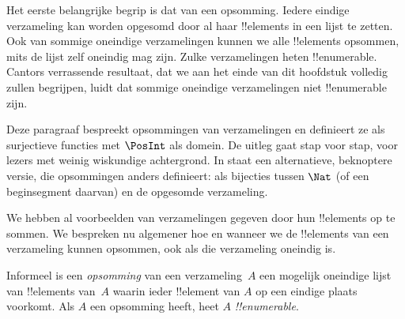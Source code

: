 \documentclass[openany]{memoir}
\begin{document}
Het eerste belangrijke begrip is dat van een opsomming. Iedere eindige
verzameling kan worden opgesomd door al haar !!{element}s in een lijst te
zetten. Ook van sommige oneindige verzamelingen kunnen we alle !!{element}s
opsommen, mits de lijst zelf oneindig mag zijn. Zulke verzamelingen heten
!!{enumerable}. Cantors verrassende resultaat, dat we aan het einde van dit
hoofdstuk volledig zullen begrijpen, luidt dat sommige oneindige verzamelingen
niet !!{enumerable} zijn.
\endgroup

\begingroup
\def\olfilename{OLP-0029}
\def\olfilepath{content/sets-functions-relations/size-of-sets/}
\hypertarget{unit-OLP-0029}{}





\begin{editorial}
  Deze paragraaf bespreekt opsommingen van verzamelingen en definieert
  ze als surjectieve functies met $\PosInt$ als domein. De uitleg gaat stap voor stap,
  voor lezers met weinig wiskundige achtergrond. In
   staat een alternatieve, beknoptere versie, die
  opsommingen anders definieert: als bijecties tussen $\Nat$ (of een
  beginsegment daarvan) en de opgesomde verzameling.
\end{editorial}

\begin{explain}
We hebben al voorbeelden van verzamelingen gegeven door hun
!!{element}s op te sommen. We bespreken nu algemener hoe en wanneer
we de !!{element}s van een verzameling kunnen opsommen, ook als die
verzameling oneindig is.
\end{explain}

\begin{defn}
Informeel is een \emph{opsomming} van een verzameling~$A$ een mogelijk
oneindige lijst van !!{element}s van~$A$ waarin ieder !!{element} van $A$
op een eindige plaats voorkomt. Als $A$ een opsomming heeft, heet $A$
\emph{!!{enumerable}}.
\end{defn}
\end{document}
